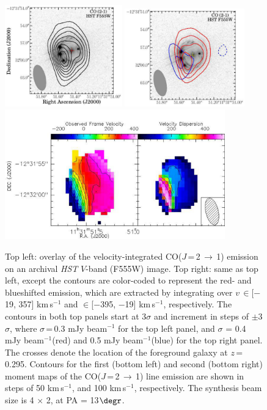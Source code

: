 \documentclass[]{emulateapj}
\newcommand{\rarr}{$\rightarrow$}
\newcommand{\bco}{\mbox{CO($J$\,=\,2\,\rarr\,1)}\xspace}
\newcommand{\kms}{\mbox{km\,s$^{-1}$}\xspace}
\newcommand{\pmOne}{\mbox{$^{-1}$}\xspace}
\begin{document}
\begin{figure}[!htbp]
\hspace{0.5em}
\includegraphics[trim=0 10 15 0, clip, width=0.452\textwidth]{f2a.pdf}
\includegraphics[trim=5 -18 0 0, clip, width=0.462\textwidth]{f2b.pdf}
\\
\includegraphics[trim=25 16 0 10, clip, width=0.85\textwidth]{f2c.pdf}
\vspace{0.1em}
\caption{Top left: overlay of the velocity-integrated \bco emission on an archival {\it HST} $V$-band (F555W)
image.
Top right: same as top left, except the contours are color-coded to represent the red- and blueshifted emission, which
are extracted by integrating over $v$\,$\in$[$-$19, 357] \kms and $\in$[$-$395, $-$19] \kms, respectively.
The contours in both top panels start at 3$\sigma$ and increment in steps of
$\pm$3$\sigma$, where $\sigma$\,=\,0.3 mJy beam\pmOne for the top left panel,
and
$\sigma$ = 0.4 mJy beam\pmOne (red) and 0.5 mJy beam\pmOne (blue)
for the top right panel.
The crosses denote the
location of the foreground galaxy at $z$\,=\,0.295.
Contours for the first (bottom left) and second (bottom right) moment maps of the \bco line emission
are shown in steps of
50 \kms, and 100 \kms, respectively.
The synthesis beam size is 4 $\times$ 2, at PA = 13$\degr$.
\label{fig:CO21mom}}
\end{figure}
\end{document}
